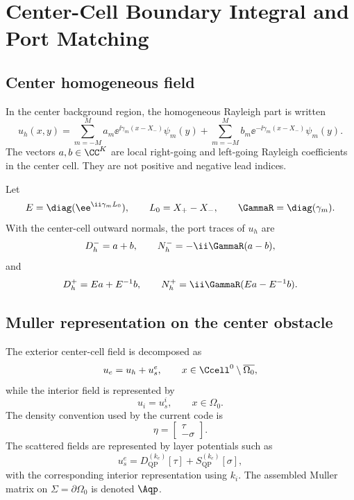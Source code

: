 %
%
%
%
%

\section{Center-Cell Boundary Integral and Port Matching}

\subsection{Center homogeneous field}

In the center background region, the homogeneous Rayleigh part is written
\[
  u_h(x,y)
  =
  \sum_{m=-M}^{M}
  a_m\ee^{\ii\gamma_m(x-X_-)}\psi_m(y)
  +
  \sum_{m=-M}^{M}
  b_m\ee^{-\ii\gamma_m(x-X_-)}\psi_m(y).
\]
The vectors \(a,b\in\CC^K\) are local right-going and left-going Rayleigh
coefficients in the center cell.  They are not positive and negative lead
indices.

Let
\[
  E=\diag(\ee^{\ii\gamma_mL_0}),
  \qquad
  L_0=X_+-X_-,
  \qquad
  \GammaR=\diag(\gamma_m).
\]
With the center-cell outward normals, the port traces of \(u_h\) are
\[
  D_h^- = a+b,
  \qquad
  N_h^- = -\ii\GammaR(a-b),
\]
and
\[
  D_h^+ = Ea+E^{-1}b,
  \qquad
  N_h^+ = \ii\GammaR(Ea-E^{-1}b).
\]

\subsection{Muller representation on the center obstacle}

The exterior center-cell field is decomposed as
\[
  u_e=u_h+u_s^e,
  \qquad
  x\in\Ccell^0\setminus\overline{\Omega_0},
\]
while the interior field is represented by
\[
  u_i=u_s^i,
  \qquad
  x\in\Omega_0 .
\]
The density convention used by the current code is
\[
  \eta=
  \begin{bmatrix}
  \tau\\
  -\sigma
  \end{bmatrix}.
\]
The scattered fields are represented by layer potentials such as
\[
  u_s^e
  =
  D_{\mathrm{QP}}^{(k_e)}[\tau]
  +
  S_{\mathrm{QP}}^{(k_e)}[\sigma],
\]
with the corresponding interior representation using \(k_i\).  The assembled
Muller matrix on \(\Sigma=\partial\Omega_0\) is denoted \(\Aqp\).

